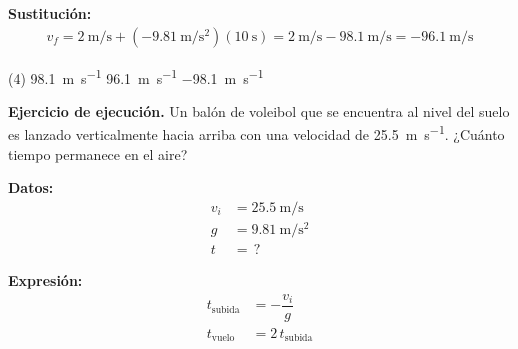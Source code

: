 \documentclass[12pt, letter]{exam}
\begin{document}
\begin{questions}
    \vspace*{0.3cm}
    \textbf{Sustitución:}
    \begin{align*}
    v_{f} = \SI[per-mode=fraction]{2}{\meter\per\second} + \left( - \SI[per-mode=fraction]{9.81}{\meter\per\square\second} \right)\left( \SI{10}{\second} \right) =  \SI[per-mode=fraction]{2}{\meter\per\second} - \SI[per-mode=fraction]{98.1}{\meter\per\second} = - \SI[per-mode=fraction]{96.1}{\meter\per\second}
    \end{align*}
    \begin{tasks}(4)
        \task \SI{98.1}{\meter\per\second}
        \task \SI{96.1}{\meter\per\second}
        \task {}
        \task \SI{-98.1}{\meter\per\second}
    \end{tasks}

    \setcounter{question}{9} \question \label{Ejercicio_06} \textbf{Ejercicio de ejecución.} Un balón de voleibol que se encuentra al nivel del suelo es lanzado verticalmente hacia arriba con una velocidad de \SI{25.5}{\meter\per\second}. ¿Cuánto tiempo permanece en el aire?

    \vspace*{0.3cm}
    \begin{minipage}[t]{0.4\linewidth}
    \textbf{Datos:}
    \begin{align*}
    v_{i} &= \SI{25.5}{\meter\per\second} \\
    g &= \SI{9.81}{\meter\per\square\second} \\
    t &= \, ?
    \end{align*}
    \end{minipage}
    \hspace{1cm}
    \begin{minipage}[t]{0.4\linewidth}
    \textbf{Expresión:}
    \begin{align*}
    t_{\text{subida}} &= - \dfrac{v_{i}}{g} \\
    t_{\text{vuelo}} &= 2 \, t_{\text{subida}}
    \end{align*}
    \end{minipage}


\end{questions}
\end{document}
